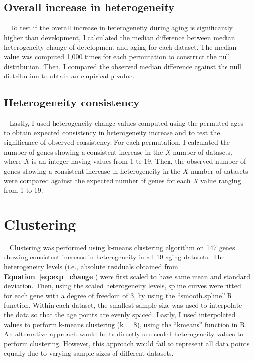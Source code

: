 \subsection{Overall increase in heterogeneity}~\label{subsec:perm.overall}
To test if the overall increase in heterogeneity during aging is significantly higher than development, 
I calculated the median difference between median heterogeneity change of development and aging for each dataset.
The median value was computed 1,000 times for each permutation to construct the null distribution.
Then, I compared the observed median difference against the null distribution to obtain an empirical p-value.

\subsection{Heterogeneity consistency}~\label{subsec:perm.consist}
Lastly, I used heterogeneity change values computed using the permuted ages to obtain expected consistency in heterogeneity increase and to test the significance of observed consistency.
For each permutation, I calculated the number of genes showing a consistent increase in the $X$ number of datasets, where $X$ is an integer having values from 1 to 19.
Then, the observed number of genes showing a consistent increase in heterogeneity in the $X$ number of datasets were compared against the expected number of genes for
each $X$ value ranging from 1 to 19.

\section{Clustering}~\label{sec:cluster}
Clustering was performed using k-means clustering algorithm on 147 genes showing consistent increase in heterogeneity in all 19 aging datasets.
The heterogeneity levels (i.e., absolute residuals obtained from \textbf{Equation~\ref{eq:exp_change}}) were first scaled to have same mean and standard deviation. 
Then, using the scaled heterogeneity levels, spline curves were fitted for each gene with a degree of freedom of 3, by using the ``smooth.spline'' R function.
Within each dataset, the smallest sample size was used to interpolate the data so that the age points are evenly spaced.
Lastly, I used interpolated values to perform k-means clustering (k = 8), using the ``kmeans'' function in R.
An alternative approach would be to directly use scaled heterogeneity values to perform clustering. 
However, this approach would fail to represent all data points equally due to varying sample sizes of different datasets.

